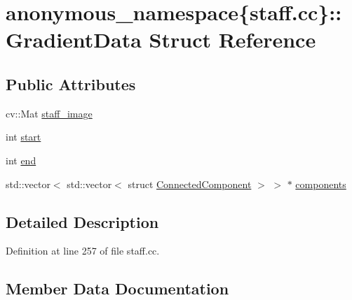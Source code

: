\hypertarget{structanonymous__namespace_02staff_8cc_03_1_1GradientData}{}\section{anonymous\+\_\+namespace\{staff.\+cc\}\+:\+:Gradient\+Data Struct Reference}
\label{structanonymous__namespace_02staff_8cc_03_1_1GradientData}
\subsection*{Public Attributes}
\begin{DoxyCompactItemize}
\item 
cv\+::\+Mat \hyperlink{structanonymous__namespace_02staff_8cc_03_1_1GradientData_a782e4d21b7e1cd9efce5424e371e7eb4}{staff\+\_\+image}
\item 
int \hyperlink{structanonymous__namespace_02staff_8cc_03_1_1GradientData_a3a79d49613666ff291eefbb3acf6bc07}{start}
\item 
int \hyperlink{structanonymous__namespace_02staff_8cc_03_1_1GradientData_ac4f2494fcfceeb929511dd9dd28c16f6}{end}
\item 
std\+::vector$<$ std\+::vector$<$ struct \hyperlink{structanonymous__namespace_02staff_8cc_03_1_1ConnectedComponent}{Connected\+Component} $>$ $>$ $\ast$ \hyperlink{structanonymous__namespace_02staff_8cc_03_1_1GradientData_ab8ff0d4a7fdbeb1f29340e160eb617ca}{components}
\end{DoxyCompactItemize}


\subsection{Detailed Description}


Definition at line 257 of file staff.\+cc.



\subsection{Member Data Documentation}
